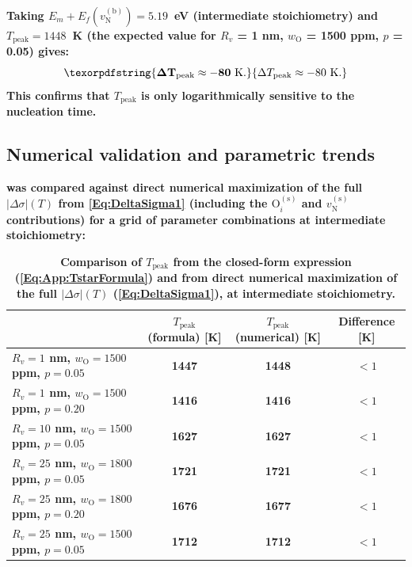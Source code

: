 \documentclass[preprint,12pt,sort&compress]{elsarticle}
\newcommand{\?}{\stackrel{?}{=}}
\providecommand{\DIFaddtex}[1]{{\bf #1}} %
\providecommand{\DIFaddFL}[1]{\DIFadd{#1}} %
\providecommand{\DIFadd}[1]{\texorpdfstring{\DIFaddtex{#1}}{#1}} %
\begin{document}
\DIFadd{Taking $E_m + E_f(v_\text{N}^{(\text{b})}) = 5.19$~eV (intermediate stoichiometry) and $T_\text{peak} = 1448$~K (the expected value for $R_v$ = 1 nm, $w_\text{O}$ = 1500 ppm, $p$ = 0.05) gives:
}\begin{equation}
\DIFadd{\Delta T_\text{peak} \approx -80~\text{K}.
}\end{equation}
\DIFadd{This confirms that $T_\text{peak}$ is only logarithmically sensitive to the nucleation time.
}

\subsection{\DIFadd{Numerical validation and parametric trends}}
\label{App:Tpeak:Validation}

\DIFadd{ was compared against direct numerical maximization of the full $|\Delta \sigma|(T)$ from \cref{Eq:DeltaSigma1} (including the $\text{O}_i^{(\text{s})}$ and $v_\text{N}^{(\text{s})}$ contributions) for a grid of parameter combinations at intermediate stoichiometry:
}

\begin{table}[h!]
\centering
\footnotesize
\caption{\DIFaddFL{Comparison of $T_\text{peak}$ from the closed-form expression (\cref{Eq:App:TstarFormula}) and from direct numerical maximization of the full $|\Delta \sigma|(T)$ (\cref{Eq:DeltaSigma1}), at intermediate stoichiometry.}}
\label{Tab:App:Tpeak}
\begin{tabular}{lccc}
\hline
 & \DIFaddFL{$T_\text{peak}$ (formula) }[\DIFaddFL{K}] & \DIFaddFL{$T_\text{peak}$ (numerical) }[\DIFaddFL{K}] & \DIFaddFL{Difference }[\DIFaddFL{K}] \\
\hline
\DIFaddFL{$R_v = 1$ nm,  $w_\text{O} = 1500$ ppm, $p = 0.05$ }& \DIFaddFL{1447 }& \DIFaddFL{1448 }& \DIFaddFL{$<1$ }\\
\DIFaddFL{$R_v = 1$ nm,  $w_\text{O} = 1500$ ppm, $p = 0.20$ }& \DIFaddFL{1416 }& \DIFaddFL{1416 }& \DIFaddFL{$<1$ }\\
\DIFaddFL{$R_v = 10$ nm, $w_\text{O} = 1500$ ppm, $p = 0.05$ }& \DIFaddFL{1627 }& \DIFaddFL{1627 }& \DIFaddFL{$<1$ }\\
\DIFaddFL{$R_v = 25$ nm, $w_\text{O} = 1800$ ppm, $p = 0.05$ }& \DIFaddFL{1721 }& \DIFaddFL{1721 }& \DIFaddFL{$<1$ }\\
\DIFaddFL{$R_v = 25$ nm, $w_\text{O} = 1800$ ppm, $p = 0.20$ }& \DIFaddFL{1676 }& \DIFaddFL{1677 }& \DIFaddFL{$<1$ }\\
\DIFaddFL{$R_v = 25$ nm, $w_\text{O} = 1500$ ppm, $p = 0.05$ }& \DIFaddFL{1712 }& \DIFaddFL{1712 }& \DIFaddFL{$<1$ }\\
\hline
\end{tabular}
\end{table}
\end{document}

